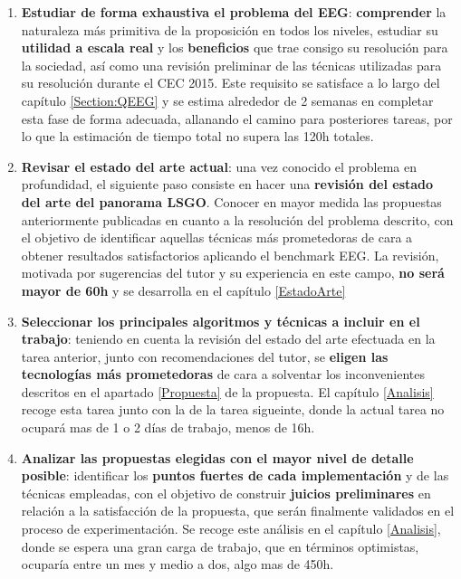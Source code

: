 \begin{enumerate}
	\item \label{tarea1} \textbf{Estudiar de forma exhaustiva el problema del EEG}: \textbf{comprender} la naturaleza más primitiva de la proposición en todos los niveles, estudiar su \textbf{utilidad a escala real} y los \textbf{beneficios} que trae consigo su resolución para la sociedad, así como una revisión preliminar de las técnicas utilizadas para su resolución durante el CEC 2015. Este requisito se satisface a lo largo del capítulo \ref{Section:QEEG} y se estima alrededor de 2 semanas en completar esta fase de forma adecuada, allanando el camino para posteriores tareas, por lo que la estimación de tiempo total no supera las 120h totales.
	
	\item \label{tarea2} \textbf{Revisar el estado del arte actual}: una vez conocido el problema en profundidad, el siguiente paso consiste en hacer una \textbf{revisión del estado del arte del panorama LSGO}. Conocer en mayor medida las propuestas anteriormente publicadas en cuanto a la resolución del problema descrito, con el objetivo de identificar aquellas técnicas más prometedoras de cara a obtener resultados satisfactorios aplicando el benchmark EEG. La revisión, motivada por sugerencias del tutor y su experiencia en este campo, \textbf{no será mayor de 60h} y se desarrolla en el capítulo \ref{EstadoArte}
	
	\item \label{tarea3} \textbf{Seleccionar los principales algoritmos y técnicas a incluir en el trabajo}: teniendo en cuenta la revisión del estado del arte efectuada en la tarea anterior, junto con recomendaciones del tutor, se \textbf{eligen las tecnologías más prometedoras} de cara a solventar los inconvenientes descritos en el apartado \ref{Propuesta} de la propuesta. El capítulo \ref{Analisis} recoge esta tarea junto con la de la tarea sigueinte, donde la actual tarea no ocupará mas de 1 o 2 días de trabajo, menos de 16h.
	
	\item  \label{tarea4}\textbf{Analizar las propuestas elegidas con el mayor nivel de detalle posible}: identificar los \textbf{puntos fuertes de cada implementación} y de las técnicas empleadas, con el objetivo de construir \textbf{juicios preliminares} en relación a la satisfacción de la propuesta, que serán finalmente validados en el proceso de experimentación. Se recoge este análisis en el capítulo \ref{Analisis}, donde se espera una gran carga de trabajo, que en términos optimistas, ocuparía entre un mes y medio a dos, algo mas de 450h.
	

\end{enumerate}
